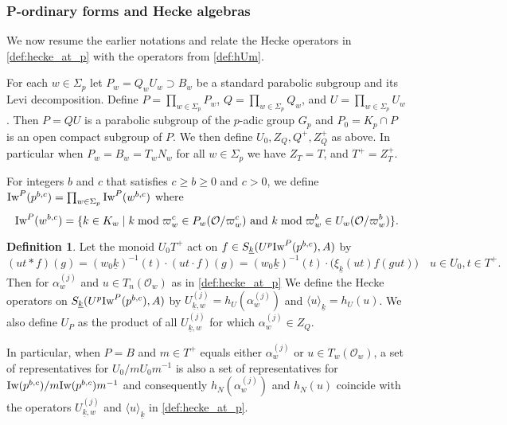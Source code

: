\documentclass[leqno]{amsart}
\theoremstyle{definition}
\newtheorem{defn}[thm]{Definition}
\theoremstyle{remark}
\newcommand{\oo}{\mathcal{O}}
\newcommand{\wt}[1]{\underline{ #1 }}
\newcommand{\Iw}{\textnormal{Iw}} %
\begin{document}
\subsubsection{P-ordinary forms and Hecke algebras}

We now resume the earlier notations and
relate the Hecke operators in \eqref{def:hecke_at_p}
with the operators from \eqref{def:hUm}.

For each  $w\in \Sigma_p$ let $P_w=Q_wU_w\supset B_w$ 
be a standard parabolic subgroup
and its Levi decomposition.
Define 
$P=\prod_{w\in \Sigma_p}P_w$, $Q=\prod_{w\in \Sigma_p}Q_w$, and
$U=\prod_{w\in \Sigma_p}U_w$.
Then $P=QU$ is a parabolic subgroup
of the $p$-adic group $G_p$ and $P_0=K_p\cap P$
is an open compact subgroup of $P$.
We then define $U_0, Z_Q, Q^+, Z_Q^+$ as above.
In particular when $P_w=B_w=T_wN_w$ for all $w\in\Sigma_p$
we have $Z_T=T$, and $T^+=Z_T^+$.

For integers $b$ and $c$ that satisfies $c\geq b\geq 0$ and $c>0$,
we define $\Iw^P(p^{b,c})=\prod_{w\in\Sigma_p}\Iw^P(w^{b,c})$ where
\begin{equation}\label{def:Iwahori_P}
	\Iw^P(w^{b,c})=\{
	k\in K_w\mid 
    k \bmod \varpi_w^c \in P_w(\oo/\varpi_w^c)
	\text{ and }
	k \bmod \varpi_w^b \in U_w(\oo/\varpi_w^b)
	\}.
\end{equation}


\begin{defn}\label{def:hecke}
Let the monoid $U_0T^+$ act on 
$f\in S_{\wt{k}}(U^p\Iw^P(p^{b,c}),A)$ by
\begin{equation}\label{def:T_act}
	(ut* f)(g)=(w_0\wt{k})^{-1}(t)\cdot (ut\cdot f)(g)=
    (w_0\wt{k})^{-1}(t)\cdot \big(\xi_{\wt{k}}(ut)f(gut)\big)\quad
    u\in U_0, t\in T^+.
\end{equation}
Then for $\alpha_w^{(j)}$ and $u\in T_n(\oo_w)$ 
as in \eqref{def:hecke_at_p}
We define the Hecke operators on
$S_{\wt{k}}(U^p\Iw^P(p^{b,c}),A)$ by
$U_{\wt{k},w}^{(j)}=h_U(\alpha_w^{(j)})$
and $\langle u\rangle_{\wt{k}}=h_U(u)$.
We also define $U_P$
as the product of all $U_{\wt{k},w}^{(j)}$
for which $\alpha_w^{(j)}\in Z_Q$.

In particular, when $P=B$
and $m\in T^+$ equals either $\alpha_{w}^{(j)}$ or $u\in T_w(\oo_w)$,
a set of representatives for $U_0/mU_0m^{-1}$
is also a set of representatives for 
$\Iw(p^{b,c})/m\Iw(p^{b,c})m^{-1}$
and consequently 
$h_N(\alpha_w^{(j)})$ and $h_N(u)$
coincide with the operators $U_{\wt{k},w}^{(j)}$ and 
$\langle u\rangle_{\wt{k}}$ in \eqref{def:hecke_at_p}.
\end{defn}
\end{document}
